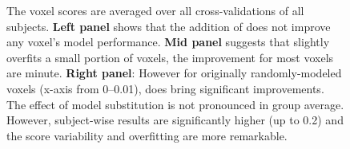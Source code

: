 \begin{figure}
    \centering
    \caption[Histogram of  with  Features]{The voxel scores are averaged over all cross-validations of all subjects. \textbf{Left panel} shows that the addition of  does not improve any voxel's model performance. \textbf{Mid panel} suggests that  slightly overfits a small portion of voxels, the improvement for most voxels are minute. \textbf{Right panel}: However for originally randomly-modeled voxels (x-axis from 0--0.01),  does bring significant improvements. The effect of model substitution is not pronounced in group average. However, subject-wise results are significantly higher (up to 0.2) and the score variability and overfitting are more remarkable.} 
    \label{fig:histo_base_best_nonsub_G}
\end{figure}





